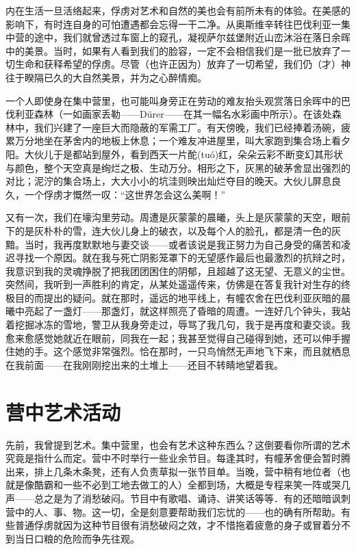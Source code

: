 \documentclass[11pt,oneside]{book}
\begin{document}
\begin{common-format}
内在生活一旦活络起来，俘虏对艺术和自然的美也会有前所未有的体验。在美感的影响下，有时连自身的可怕遭遇都会忘得一干二净。从奥斯维辛转往巴伐利亚一集中营的途中，我们就曾透过车窗上的窥孔，凝视萨尔兹堡附近山峦沐浴在落日余晖中的美景。当时，如果有人看到我们的脸容，一定不会相信我们是一批已放弃了一切生命和获释希望的俘虏。尽管（也许正因为）放弃了一切希望，我们仍（才）神往于睽隔已久的大自然美景，并为之心醉情痴。

一个人即使身在集中营里，也可能叫身旁正在劳动的难友抬头观赏落日余晖中的巴伐利亚森林（一如画家丢勒——Dürer——在其一幅名水彩画中所示）。在该处森林中，我们兴建了一座巨大而隐蔽的军需工厂。有天傍晚，我们已经捧着汤碗，疲累万分地坐在茅舍内的地板上休息；一个难友冲进屋里，叫大家跑到集合场上看夕阳。大伙儿于是都站到屋外，看到西天一片酡(tuó)红，朵朵云彩不断变幻其形状与颜色，整个天空真是绚烂之极、生动万分。相形之下，灰黑的破茅舍显出强烈的对比；泥泞的集合场上，大大小小的坑洼则映出灿烂夺目的晚天。大伙儿屏息良久，一个俘虏才慨然一叹：“这世界怎会这么美啊！”

又有一次，我们在壕沟里劳动。周遭是灰蒙蒙的晨曦，头上是灰蒙蒙的天空，眼前下的是灰朴朴的雪，连大伙儿身上的破衣，以及每个人的脸孔，都是清一色的灰黯。当时，我再度默默地与妻交谈——或者该说是我正努力为自己身受的痛苦和凌迟寻找一个原因。就在我与死亡阴影笼罩下的无望感作最后也最激烈的抗辩之时，我意识到我的灵魂挣脱了把我团团困住的阴郁，且超越了这无望、无意义的尘世。突然间，我听到一声胜利的肯定，从某处遥遥传来，仿佛是在答复我针对生存的终极目的而提出的疑问。就在那时，遥远的地平线上，有幢农舍在巴伐利亚灰暗的晨曦中亮起了一盏灯——那盏灯，就这样照亮了昏暗的周遭。一连好几个钟头，我站着挖掘冰冻的雪地，警卫从我身旁走过，辱骂了我几句，我于是再度和妻交谈。我愈来愈感觉她就近在眼前，同我在一起；我甚至觉得自己碰得到她，还可以伸手握住她的手。这个感觉非常强烈。恰在那时，一只鸟悄然无声地飞下来，而且就栖息在我前面——在我刚刚挖出来的土堆上——还目不转睛地望着我。


\section{营中艺术活动}
先前，我曾提到艺术。集中营里，也会有艺术这种东西么？这倒要看你所谓的艺术究竟是指什么而定。营中不时举行一些业余节目。每逢其时，有幢茅舍便会暂时腾出来，排上几条木条凳，还有人负责草拟一张节目单。当晚，营中稍有地位者（也就是像酷霸和一些不必到工地去做工的人）全都到场，大概是专程来笑一阵或哭几声——总之是为了消愁破闷。节目中有歌唱、诵诗、讲笑话等等．有的还暗暗讽刺营中的人、事、物。这一切，全是刻意要帮助我们忘忧的——也的确有所帮助。有些普通俘虏就因为这种节目很有消愁破闷之效，才不惜拖着疲惫的身子或冒着分不到当日口粮的危险而争先往观。


\end{common-format}
\end{document}
